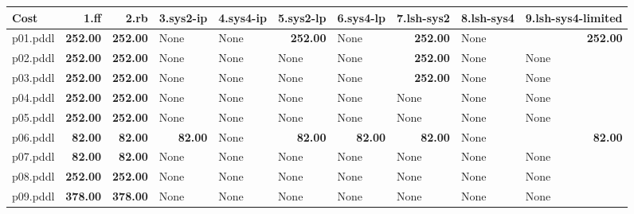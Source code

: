 \documentclass{article}
\begin{document}
\begin{tabular}{@{}lrrrrrrrrr@{}}
Cost & 1.ff & 2.rb & 3.sys2-ip & 4.sys4-ip & 5.sys2-lp & 6.sys4-lp & 7.lsh-sys2 & 8.lsh-sys4 & 9.lsh-sys4-limited \\
\midrule
p01.pddl & \textbf{252.00} & \textbf{252.00} & \multicolumn{1}{|l|}{None} & \multicolumn{1}{|l|}{None} & \textbf{252.00} & \multicolumn{1}{|l|}{None} & \textbf{252.00} & \multicolumn{1}{|l|}{None} & \textbf{252.00} \\
p02.pddl & \textbf{252.00} & \textbf{252.00} & \multicolumn{1}{|l|}{None} & \multicolumn{1}{|l|}{None} & \multicolumn{1}{|l|}{None} & \multicolumn{1}{|l|}{None} & \textbf{252.00} & \multicolumn{1}{|l|}{None} & \multicolumn{1}{|l|}{None} \\
p03.pddl & \textbf{252.00} & \textbf{252.00} & \multicolumn{1}{|l|}{None} & \multicolumn{1}{|l|}{None} & \multicolumn{1}{|l|}{None} & \multicolumn{1}{|l|}{None} & \textbf{252.00} & \multicolumn{1}{|l|}{None} & \multicolumn{1}{|l|}{None} \\
p04.pddl & \textbf{252.00} & \textbf{252.00} & \multicolumn{1}{|l|}{None} & \multicolumn{1}{|l|}{None} & \multicolumn{1}{|l|}{None} & \multicolumn{1}{|l|}{None} & \multicolumn{1}{|l|}{None} & \multicolumn{1}{|l|}{None} & \multicolumn{1}{|l|}{None} \\
p05.pddl & \textbf{252.00} & \textbf{252.00} & \multicolumn{1}{|l|}{None} & \multicolumn{1}{|l|}{None} & \multicolumn{1}{|l|}{None} & \multicolumn{1}{|l|}{None} & \multicolumn{1}{|l|}{None} & \multicolumn{1}{|l|}{None} & \multicolumn{1}{|l|}{None} \\
p06.pddl & \textbf{82.00} & \textbf{82.00} & \textbf{82.00} & \multicolumn{1}{|l|}{None} & \textbf{82.00} & \textbf{82.00} & \textbf{82.00} & \multicolumn{1}{|l|}{None} & \textbf{82.00} \\
p07.pddl & \textbf{82.00} & \textbf{82.00} & \multicolumn{1}{|l|}{None} & \multicolumn{1}{|l|}{None} & \multicolumn{1}{|l|}{None} & \multicolumn{1}{|l|}{None} & \multicolumn{1}{|l|}{None} & \multicolumn{1}{|l|}{None} & \multicolumn{1}{|l|}{None} \\
p08.pddl & \textbf{252.00} & \textbf{252.00} & \multicolumn{1}{|l|}{None} & \multicolumn{1}{|l|}{None} & \multicolumn{1}{|l|}{None} & \multicolumn{1}{|l|}{None} & \multicolumn{1}{|l|}{None} & \multicolumn{1}{|l|}{None} & \multicolumn{1}{|l|}{None} \\
p09.pddl & \textbf{378.00} & \textbf{378.00} & \multicolumn{1}{|l|}{None} & \multicolumn{1}{|l|}{None} & \multicolumn{1}{|l|}{None} & \multicolumn{1}{|l|}{None} & \multicolumn{1}{|l|}{None} & \multicolumn{1}{|l|}{None} & \multicolumn{1}{|l|}{None} \\

\end{tabular}
\end{document}
